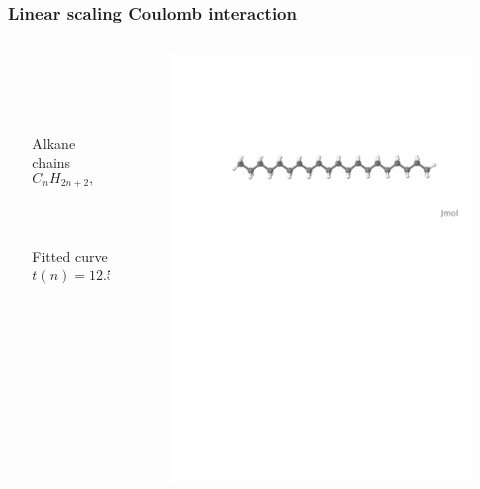 \documentclass[mathserif, 10pt]{beamer}
\begin{document}
\begin{frame}
    \frametitle{Linear scaling Coulomb interaction}
    \begin{columns}
    \begin{column}{.10\textwidth}
    \ \\
    \end{column}
    \begin{column}{.40\textwidth}
	\centering
	\ \\
	\ \\
	\ \\
	\ \\
	Alkane chains
	\begin{equation}
	    \nonumber
	    C_{n}H_{2n+2}, \qquad n=2,\dots,70
	\end{equation}
	\ \\
	\ \\
	\ \\
	Fitted curve
	\begin{equation}
	    \nonumber
	    t(n) = 12.5 + 2.34n^{0.754} 
	\end{equation}
    \end{column}
    \begin{column}{.50\textwidth}
	\centering
	\begin{figure}
	    \includegraphics[scale=0.3, clip, viewport = 80 560 600 720]{figures/alkane.pdf}

\end{figure}
\end{column}
\end{columns}
\end{frame}
\end{document}
